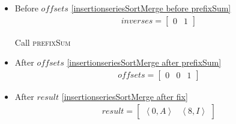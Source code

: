 \begin{frame}[containsverbatim]{\insertionseriesexampleframe}
\begin{columns}[c]
\begin{column}{0.65\textwidth}
\begin{multicols}{2}
\begin{itemize}
                            \item Before $offsets$ \cref{insertionseriesSortMerge before prefixSum}
                            \begin{align*}
                                inverses = \begin{bmatrix}0 & 1\end{bmatrix}
                            \end{align*}

                            Call \textsc{prefixSum}

                            \item After $offsets$ \cref{insertionseriesSortMerge after prefixSum}
                            \begin{align*}
                                offsets = \begin{bmatrix}0 & 0 & 1\end{bmatrix}
                            \end{align*}

                            \item After $result$ \cref{insertionseriesSortMerge after fix}
                            \begin{align*}
                                result = \begin{bmatrix}\left<0, A\right> & \left<8, I\right>\end{bmatrix}
                            \end{align*}
                        \end{itemize}
                    \end{multicols}
                \end{column}
            \end{columns}
        \end{frame}


